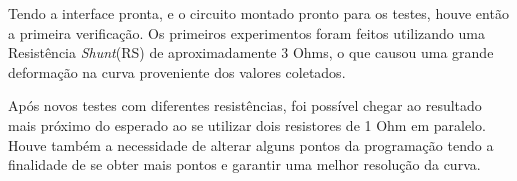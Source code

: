 Tendo a interface pronta, e o circuito montado pronto para os testes, houve então a primeira verificação. Os primeiros experimentos foram feitos utilizando uma Resistência \textit{Shunt}(RS) de aproximadamente 3 Ohms, o que causou uma grande deformação na curva proveniente dos valores coletados.

Após novos testes com diferentes resistências, foi  possível chegar ao resultado mais próximo do esperado ao se utilizar dois resistores de 1 Ohm em paralelo. Houve também a necessidade de alterar alguns pontos da programação tendo a finalidade de se obter mais pontos e garantir uma melhor resolução da curva.



